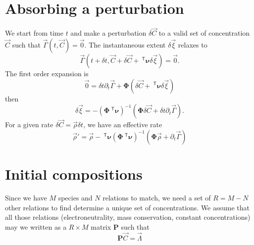 \documentclass[aps]{revtex4}
\newcommand{\mymat}[1]{\bm{#1}}
\newcommand{\mytrn}[1]{~^{\mathsf{T}}{#1}}
\begin{document}
\section{Absorbing a perturbation}
We start from time $t$ and make a perturbation $\delta\vec{C}$ to a valid set of concentration $\vec{C}$ such that 
$\vec{\Gamma}(t,\vec{C})=\vec{0}$.
The instantaneous extent $\delta\vec{\xi}$ relaxes to 
$$
\vec{\Gamma}(t+\delta t,\vec{C}+\delta\vec{C}+\mytrn{\mymat{\nu}}\delta\vec{\xi}) = \vec{0}.
$$
The first order expansion
is
$$
	\vec{0} = \delta t \partial_t \vec{\Gamma} + \mymat{\Phi}\left( \delta\vec{C} + \mytrn{\mymat{\nu}}\delta\vec{\xi} \right)
$$
then
$$
	\delta\vec{\xi} = -\left(\mymat{\Phi}\mytrn{\mymat{\nu}}\right)^{-1}\left(\mymat{\Phi}\delta\vec{C}+\delta t \partial_t\vec{\Gamma}\right).
$$
For a given rate $\delta\vec{C} = \vec{\rho} \delta t$, we have an effective rate
$$
	\vec{\rho}' = \vec{\rho} -  \mytrn{\mymat{\nu}}\left(\mymat{\Phi}\mytrn{\mymat{\nu}}\right)^{-1}\left(\mymat{\Phi}\vec{\rho}+\partial_t\vec{\Gamma}\right)
$$

\section{Initial compositions}
Since we have $M$ species and $N$ relations to match, we need
a set of $R=M-N$ other relations to find determine a unique set of concentrations.
We assume that all those relations (electroneutrality, mass conservation, constant concentrations)
may we written as a $R\times M$ matrix $\mymat{P}$ such that
$$
	\mymat{P}\vec{C} = \vec{\Lambda}
$$
\end{document}

